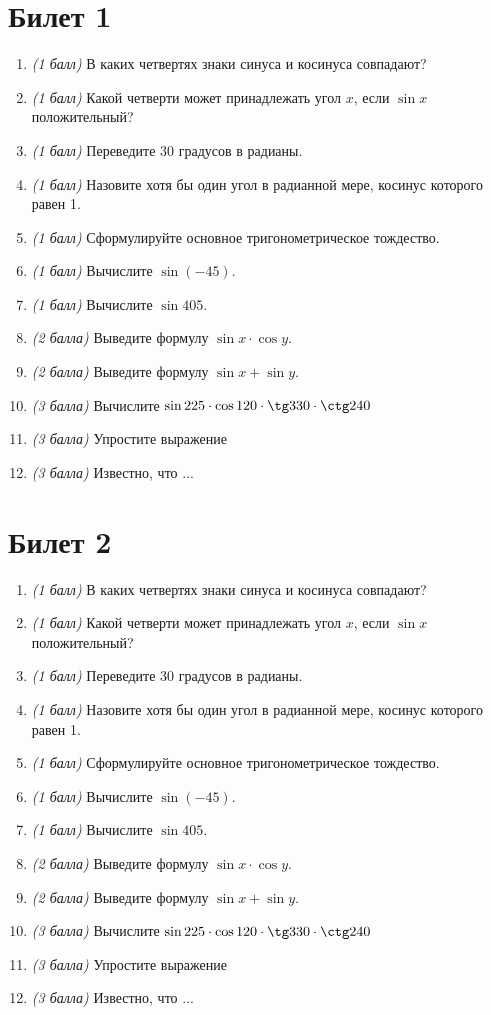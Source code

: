 \documentclass[12pt, a4paper]{article}
\begin{document}
\section*{Билет 1}
\begin{enumerate}
	\item \textit{(1 балл)} В каких четвертях знаки синуса и косинуса совпадают?
	\item \textit{(1 балл)} Какой четверти может принадлежать угол $x$, если $\sin x$ положительный?
	\item \textit{(1 балл)} Переведите 30 градусов в радианы.
	\item \textit{(1 балл)} Назовите хотя бы один угол в радианной мере, косинус которого равен 1.
	\item \textit{(1 балл)} Сформулируйте основное тригонометрическое тождество.
	\item \textit{(1 балл)} Вычислите $\sin (-45)$.
	\item \textit{(1 балл)} Вычислите $\sin 405$.
	\item \textit{(2 балла)} Выведите формулу $\sin x \cdot \cos y$.
	\item \textit{(2 балла)} Выведите формулу $\sin x + \sin y$.
	\item \textit{(3 балла)} Вычислите $\sin 225 \cdot \cos 120  \cdot \tg 330 \cdot \ctg 240$
	\item \textit{(3 балла)} Упростите выражение
	\item \textit{(3 балла)} Известно, что ...
\end{enumerate}
\section*{Билет 2}
\begin{enumerate}
	\item \textit{(1 балл)} В каких четвертях знаки синуса и косинуса совпадают?
	\item \textit{(1 балл)} Какой четверти может принадлежать угол $x$, если $\sin x$ положительный?
	\item \textit{(1 балл)} Переведите 30 градусов в радианы.
	\item \textit{(1 балл)} Назовите хотя бы один угол в радианной мере, косинус которого равен 1.
	\item \textit{(1 балл)} Сформулируйте основное тригонометрическое тождество.
	\item \textit{(1 балл)} Вычислите $\sin (-45)$.
	\item \textit{(1 балл)} Вычислите $\sin 405$.
	\item \textit{(2 балла)} Выведите формулу $\sin x \cdot \cos y$.
	\item \textit{(2 балла)} Выведите формулу $\sin x + \sin y$.
	\item \textit{(3 балла)} Вычислите $\sin 225 \cdot \cos 120  \cdot \tg 330 \cdot \ctg 240$
	\item \textit{(3 балла)} Упростите выражение
	\item \textit{(3 балла)} Известно, что ...
\end{enumerate}
\end{document}
